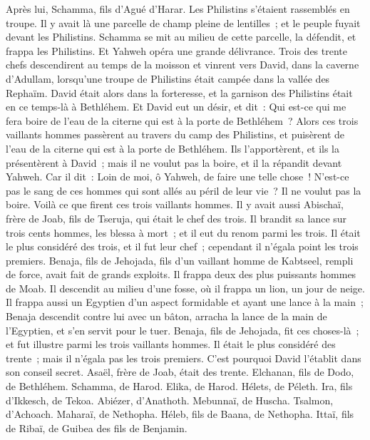\begin{multicols}{2}
Après lui, Schamma, fils d'Agué d'Harar. Les Philistins s'étaient rassemblés en troupe. Il y avait là une parcelle de champ pleine de lentilles~; et le peuple fuyait devant les Philistins.
Schamma se mit au milieu de cette parcelle, la défendit, et frappa les Philistins. Et Yahweh opéra une grande délivrance.
Trois des trente chefs descendirent au temps de la moisson et vinrent vers David, dans la caverne d'Adullam, lorsqu'une troupe de Philistins était campée dans la vallée des Rephaïm.
David était alors dans la forteresse, et la garnison des Philistins était en ce temps-là à Bethléhem.
Et David eut un désir, et dit~: Qui est-ce qui me fera boire de l'eau de la citerne qui est à la porte de Bethléhem~?
Alors ces trois vaillants hommes passèrent au travers du camp des Philistins, et puisèrent de l'eau de la citerne qui est à la porte de Bethléhem. Ils l'apportèrent, et ils la présentèrent à David~; mais il ne voulut pas la boire, et il la répandit devant Yahweh.
Car il dit~: Loin de moi, ô Yahweh, de faire une telle chose~! N'est-ce pas le sang de ces hommes qui sont allés au péril de leur vie~? Il ne voulut pas la boire. Voilà ce que firent ces trois vaillants hommes.
Il y avait aussi Abischaï, frère de Joab, fils de Tseruja, qui était le chef des trois. Il brandit sa lance sur trois cents hommes, les blessa à mort~; et il eut du renom parmi les trois.
Il était le plus considéré des trois, et il fut leur chef~; cependant il n'égala point les trois premiers.
Benaja, fils de Jehojada, fils d'un vaillant homme de Kabtseel, rempli de force, avait fait de grands exploits. Il frappa deux des plus puissants hommes de Moab. Il descendit au milieu d'une fosse, où il frappa un lion, un jour de neige.
Il frappa aussi un Egyptien d'un aspect formidable et ayant une lance à la main~; Benaja descendit contre lui avec un bâton, arracha la lance de la main de l'Egyptien, et s'en servit pour le tuer.
Benaja, fils de Jehojada, fit ces choses-là~; et fut illustre parmi les trois vaillants hommes.
Il était le plus considéré des trente~; mais il n'égala pas les trois premiers. C'est pourquoi David l'établit dans son conseil secret.
Asaël, frère de Joab, était des trente. Elchanan, fils de Dodo, de Bethléhem.
Schamma, de Harod. Elika, de Harod.
Hélets, de Péleth. Ira, fils d'Ikkesch, de Tekoa.
Abiézer, d'Anathoth. Mebunnaï, de Huscha.
Tsalmon, d'Achoach. Maharaï, de Nethopha.
Héleb, fils de Baana, de Nethopha. Ittaï, fils de Ribaï, de Guibea des fils de Benjamin.

\end{multicols}
